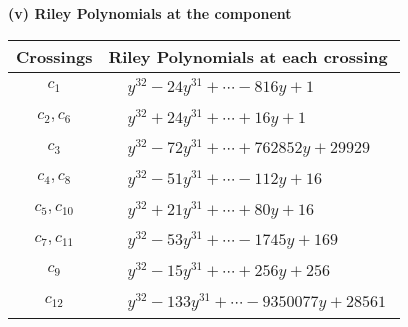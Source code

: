 \documentclass[1p]{elsarticle_modified}
\theoremstyle{definition}
\begin{document}
\newpage\renewcommand{\arraystretch}{1}
\flushleft \textbf{(v) Riley Polynomials at the component}\newline \\
\begin{tabular}{m{50pt}|m{274pt}}
Crossings & \hspace{64pt}Riley Polynomials at each crossing \\
\hline $$\begin{aligned}c_{1}\end{aligned}$$&$\begin{aligned}
&y^{32}-24 y^{31}+\cdots-816 y+1
\end{aligned}$\\
\hline $$\begin{aligned}c_{2},c_{6}\end{aligned}$$&$\begin{aligned}
&y^{32}+24 y^{31}+\cdots+16 y+1
\end{aligned}$\\
\hline $$\begin{aligned}c_{3}\end{aligned}$$&$\begin{aligned}
&y^{32}-72 y^{31}+\cdots+762852 y+29929
\end{aligned}$\\
\hline $$\begin{aligned}c_{4},c_{8}\end{aligned}$$&$\begin{aligned}
&y^{32}-51 y^{31}+\cdots-112 y+16
\end{aligned}$\\
\hline $$\begin{aligned}c_{5},c_{10}\end{aligned}$$&$\begin{aligned}
&y^{32}+21 y^{31}+\cdots+80 y+16
\end{aligned}$\\
\hline $$\begin{aligned}c_{7},c_{11}\end{aligned}$$&$\begin{aligned}
&y^{32}-53 y^{31}+\cdots-1745 y+169
\end{aligned}$\\
\hline $$\begin{aligned}c_{9}\end{aligned}$$&$\begin{aligned}
&y^{32}-15 y^{31}+\cdots+256 y+256
\end{aligned}$\\
\hline $$\begin{aligned}c_{12}\end{aligned}$$&$\begin{aligned}
&y^{32}-133 y^{31}+\cdots-9350077 y+28561
\end{aligned}$\\
\hline
\end{tabular}\\~\\
\end{document}
